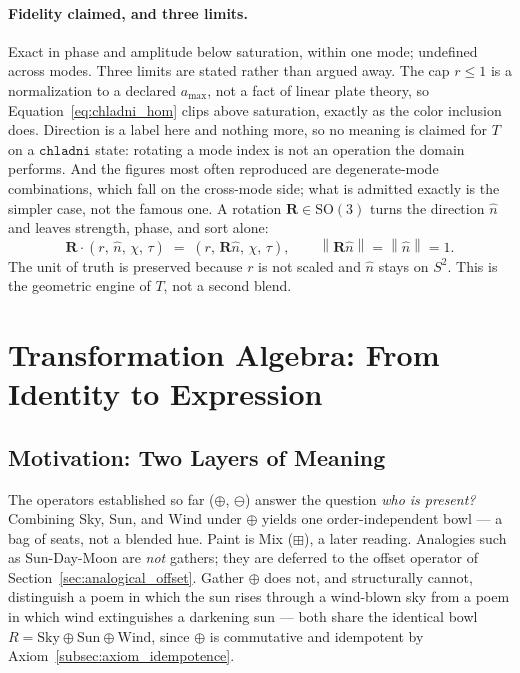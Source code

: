 \documentclass[12pt, a4paper]{article}
\providecommand{\norm}[1]{\left\lVert#1\right\rVert}
\begin{document}
\paragraph{Fidelity claimed, and three limits.}
Exact in phase and amplitude below saturation, within one mode;
undefined across modes. Three limits are stated rather than argued
away. The cap $r\le 1$ is a normalization to a declared $a_{\max}$,
not a fact of linear plate theory, so
Equation~\eqref{eq:chladni_hom} clips above saturation, exactly as the
color inclusion does. Direction is a label here and nothing more,
so no meaning is claimed for $T$ on a $\mathtt{chladni}$ state:
rotating a mode index is not an operation the domain performs. And the
figures most often reproduced are degenerate-mode combinations, which
fall on the cross-mode side; what is admitted exactly is the simpler
case, not the famous one.
\label{subsec:axiom_rotation}
A rotation $\mathbf{R} \in \mathrm{SO}(3)$ turns the direction $\hat n$ and leaves strength, phase, and sort alone:
\begin{equation}
    \mathbf{R}\cdot(r,\,\hat n,\,\chi,\,\tau)
    \;=\;
    (r,\,\mathbf{R}\hat n,\,\chi,\,\tau),
    \qquad
    \norm{\mathbf{R}\hat n} = \norm{\hat n} = 1.
\end{equation}
The unit of truth is preserved because $r$ is not scaled and $\hat n$ stays on $S^2$. This is the geometric engine of $T$, not a second blend.

\section{Transformation Algebra: From Identity to Expression}
\label{sec:transformation_algebra}

\subsection{Motivation: Two Layers of Meaning}
\label{subsec:transform_motivation}
The operators established so far ($\oplus$, $\ominus$) answer the question
\emph{who is present?} Combining Sky, Sun, and Wind under $\oplus$
yields one order-independent bowl --- a bag of seats, not a blended
hue. Paint is Mix ($\boxplus$), a later reading. Analogies such as Sun-Day-Moon are \emph{not} gathers; they are deferred to the offset operator of Section~\ref{sec:analogical_offset}. Gather $\oplus$ does not, and structurally
cannot, distinguish a poem in which the sun rises through a wind-blown
sky from a poem in which wind extinguishes a darkening sun --- both
share the identical bowl
$R = \text{Sky} \oplus \text{Sun} \oplus \text{Wind}$, since $\oplus$
is commutative and idempotent by Axiom~\ref{subsec:axiom_idempotence}.
\end{document}

